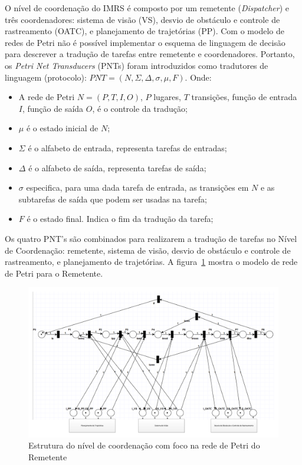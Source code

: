 O nível de coordenação do IMRS é composto por um remetente
(\emph{Dispatcher}) e três coordenadores: sistema de visão (VS), desvio de
obstáculo e controle de rastreamento (OATC), e planejamento de trajetórias (PP).
Com o modelo de redes de Petri não é possível implementar o esquema de linguagem de
decisão para descrever a tradução de tarefas entre remetente e coordenadores.
Portanto, os \emph{Petri Net Transducers} (PNTs) foram introduzidos como
tradutores de linguagem (protocolo): $PNT = (N,\Sigma,
\Delta, \sigma, \mu, F)$. Onde:
\begin{itemize}
	\item A rede de Petri $N=(P,T,I,O)$, $P$ lugares, $T$
transições, função de entrada $I$, função de saída $O$, é o controle da
tradução;
	\item $\mu$ é o estado inicial de $N$;
	\item $\Sigma$ é o alfabeto de entrada, representa tarefas de entradas;
	\item $\Delta$ é o alfabeto de saída, representa tarefas de saída; 
	\item $\sigma$ especifica, para uma dada tarefa de entrada, as transições em
$N$ e as subtarefas de saída que podem ser usadas na tarefa;
	\item $F$ é o estado final. Indica o fim da tradução da tarefa;
\end{itemize}    

Os quatro PNT's são combinados para realizarem a tradução de tarefas no Nível
de Coordenação: remetente, sistema de visão, desvio de obstáculo
e controle de rastreamento, e planejamento de trajetórias. A
figura~\ref{Saridis_2} mostra o modelo de rede de Petri para o Remetente.


\begin{figure}[H]
\centering
\includegraphics[width=1\columnwidth,angle=90]{figs/SARIDIS_2.pdf}
\caption{Estrutura do nível de coordenação com foco na rede de Petri do
Remetente}
\label{Saridis_2}
\end{figure}

